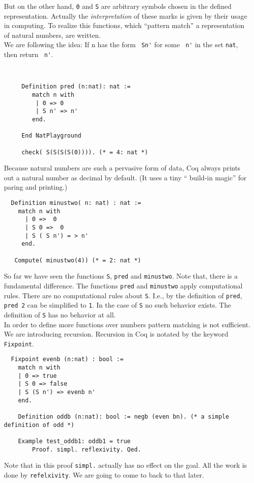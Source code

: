   But on the other hand, \lstinline!0! and \lstinline!S! are arbitrary symbols chosen in the defined representation. 
  Actually the {\itshape interpretation} of these marks is given by their usage in computing.
  To realize this functions, which ``pattern match'' a representation of natural numbers, are written.\\  
  We are following the idea:  If n has the form \lstinline! Sn'! for some \lstinline! n'! in the set \lstinline!nat!, then return  \lstinline! n'!.
  \begin{example}~\\\vspace{-10mm}
   \begin{lstlisting}
  	 Definition pred (n:nat): nat :=
   		match n with 
   	     | 0 => 0
   	     | S n' => n'
   	    end. 
   	  
   	 End NatPlayground
   	 
   	 check( S(S(S(S(0)))). (* = 4: nat *)
   \end{lstlisting}
  \end{example}
  Because natural numbers are such a pervasive form of data, Coq always prints out a natural number as decimal by default.
  (It uses a tiny `` build-in magic'' for paring and printing.)
 
  \begin{lstlisting}
  Definition minustwo( n: nat) : nat :=
    match n with
      | 0 =>  0
      | S 0 =>  0
      | S ( S n') = > n'
     end.
     
   Compute( minustwo(4)) (* = 2: nat *)
  \end{lstlisting}  
  So far we have seen the functions \lstinline!S!, \lstinline!pred! and \lstinline!minustwo!.
  Note that, there is a fundamental difference.
  The functions \lstinline!pred! and \lstinline!minustwo! apply computational rules. 
  There are no computational rules about \lstinline!S!.
  I.e., by the definition of \lstinline!pred!, \lstinline!pred 2! can be simplified to \lstinline!1!. 
  In the case of \lstinline!S! no such behavior exists.
  The definition of \lstinline!S! has no behavior at all.\\     
  In order to define more functions over numbers pattern matching is not sufficient. We are introducing recursion.
  Recursion in Coq is notated by the keyword \lstinline!Fixpoint!.
  
  \begin{lstlisting}
  Fixpoint evenb (n:nat) : bool :=
  	match n with
  	| 0 => true
  	| S 0 => false
  	| S (S n') => evenb n'
  	end.
  	
  	Definition oddb (n:nat): bool := negb (even bn). (* a simple definition of odd *)
  	
  	Example test_oddb1: oddb1 = true
    	Proof. simpl. reflexivity. Qed.
  \end{lstlisting}
   Note that in this proof \lstinline!simpl.! actually has no effect on the goal. 
   All the work is done by \lstinline!refelxivity!. 
   We are going to come to back to that later.
   
